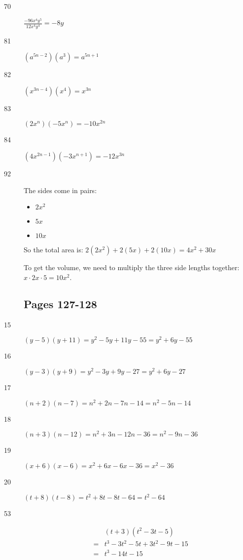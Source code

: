 \documentclass[fleqn,addpoints]{exam}
\begin{document}
\begin{description}
\item[70]
\( \displaystyle \frac{-96x^4y^5}{12x^4y^4} = -8y \)

\item[81]
\( (a^{5n-2})(a^3) = a^{5n+1} \)

\item[82]
\( (x^{3n-4})(x^4) = x^{3n} \)

\item[83]
\( (2x^n)(-5x^n) = -10x^{2n} \)

\item[84]
\( (4x^{2n-1})(-3x^{n+1}) = -12x^{3n} \)

\item[92]

The sides come in pairs: 
\begin{itemize}
  \item \( 2x^2 \)
  \item \( 5x \)
  \item \( 10x \)
\end{itemize}

So the total area is: \( 2(2x^2) + 2(5x) + 2(10x) = 4x^2 + 30x \)

To get the volume, we need to multiply the three side lengths together: 
\(x \cdot 2x \cdot 5 = 10x^2 \).

\subsection{Pages 127-128}

\item[15]
\( (y-5)(y+11) = y^2 -5y + 11y - 55 = y^2 + 6y - 55 \)

\item[16]
\( (y - 3)(y + 9) = y^2 - 3y + 9y - 27 = y^2 + 6y - 27 \)

\item[17]
\( (n + 2)(n - 7) = n^2 + 2n - 7n - 14 = n^2 - 5n - 14 \)

\item[18]
\( (n + 3)(n - 12) = n^2 + 3n - 12n - 36 = n^2 - 9n - 36 \)

\item[19]
\( (x + 6)(x - 6) = x^2 + 6x - 6x - 36 = x^2 - 36 \)

\item[20]
\( (t + 8)(t - 8) = t^2 + 8t - 8t - 64 = t^2 - 64 \)

\item[53]
\begin{eqnarray*}
  && (t + 3)(t^2 - 3t - 5) \\
  &=& t^3 - 3t^2 - 5t + 3t^2 - 9t - 15 \\
  &=& t^3 - 14t - 15 \\
\end{eqnarray*}


\end{description}
\end{document}
